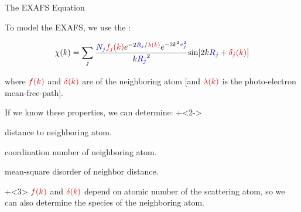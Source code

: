 \begin{slide}{The EXAFS Equation}

  To model the EXAFS, we use the {}:
  \vspace{-1mm}

  \begin{center}
    \[ \chi(k) = \sum_j {\frac{{\Blue{N_j}} {\Red{f_j(k)}}
        e^{-2{\Blue{R_j}}/{\Red{\lambda(k)}}}
        e^{-2k^2{\Blue{\sigma_j^2}}}}{k{\Blue{R_j}}^2}
      {\sin[{2k{\Blue{R_j}} + {\Red{\delta_j(k)}}] }}} \]
  \end{center}

  \vmm

  where $\Red{f(k)}$ and $\Red{\delta(k)}$ are
  {} of the neighboring
  atom [and $ \Red{\lambda(k)} $ is the photo-electron mean-free-path].

  \vmm
  If we know these properties, we can determine:
  \onslide+<2->
    \begin{description}
      \settowidth{\labelwidth}{15mm}
      \setlength{\itemindent}{15mm}
      \setlength{\leftmargin}{15mm}
    \item[$R$] distance to neighboring atom.
    \item[$N$] coordination number of neighboring atom.
    \item[$\sigma^2$] mean-square disorder of neighbor distance.
    \end{description}

  \vmm
  \onslide+<3>
  ${\Red{f(k)}}$ and ${\Red{\delta(k)}}$ depend on atomic number
  {} of the scattering atom, so we can also determine the
  species of the neighboring atom.

\end{slide}


